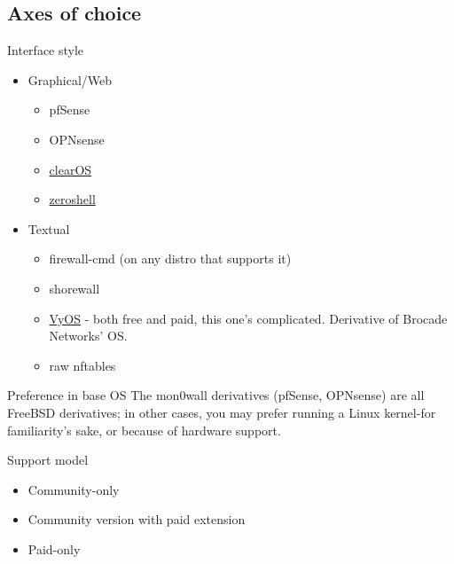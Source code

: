 \documentclass[bigger]{beamer}
\begin{document}
\subsection{Axes of choice}
\label{sec:org84da425}

\begin{frame}[label={sec:orgb205e75}]{Interface style}

  \begin{itemize}
  \item<2-> Graphical/Web
    \begin{itemize}
    \item pfSense
    \item OPNsense
    \item \href{https://www.clearos.com/}{clearOS}
    \item \href{https://zeroshell.org/}{zeroshell}
    \end{itemize}

  \item<3-> Textual
    \begin{itemize}
    \item firewall-cmd (on any distro that supports it)
    \item shorewall
    \item \href{https://www.vyos.io/}{VyOS} - both free and paid, this one's complicated. Derivative of Brocade
      Networks' OS.
    \item raw nftables
    \end{itemize}
  \end{itemize}
\end{frame}

\begin{frame}[label={sec:orgdb902ba}]{Preference in base OS}
The mon0wall derivatives (pfSense, OPNsense) are all FreeBSD derivatives; in
other cases, you may prefer running a Linux kernel-for familiarity's sake,
or because of hardware support.
\end{frame}

\begin{frame}[label={sec:org991cbe7}]{Support model}
  \begin{itemize}
  \item Community-only
  \item Community version with paid extension
  \item Paid-only
  \end{itemize}
\end{frame}
\end{document}
